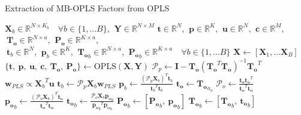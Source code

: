 \begin{algorithm}[H]
\caption{Extraction of MB-OPLS Factors from OPLS}
\label{algorithm.3.7}
\begin{algorithmic}[1]
\REQUIRE $\mathbf{X}_b \in \mathbb{R}^{N \times K_b}
          \quad \forall b \in \{1, \dots B\}$,%
       $\:\mathbf{Y} \in \mathbb{R}^{N \times M}$
\ENSURE $\mathbf{t} \in \mathbb{R}^N$,%
      $\:\mathbf{p} \in \mathbb{R}^K$,%
      $\:\mathbf{u} \in \mathbb{R}^N$,%
      $\:\mathbf{c} \in \mathbb{R}^M$,%
      $\:\mathbf{T_o} \in \mathbb{R}^{N \times a}$,%
      $\:\mathbf{P_o} \in \mathbb{R}^{K \times a}$, \\
      $\:\mathbf{t}_b \in \mathbb{R}^N$,%
      $\:\mathbf{p}_b \in \mathbb{R}^K$,%
      $\:\mathbf{T_o}_b \in \mathbb{R}^{N \times a}$,%
      $\:\mathbf{P_o}_b \in \mathbb{R}^{K \times a}
       \quad \forall b \in \{1, \dots B\}$
\STATE $\mathbf{X} \gets [\mathbf{X}_1, \dots \mathbf{X}_B]$
\STATE $\{\mathbf{t}, \: \mathbf{p}, \: \mathbf{u}, \: \mathbf{c}, \:
        \mathbf{T_o}, \: \mathbf{P_o}\} \gets
        \mathrm{OPLS}(\mathbf{X}, \mathbf{Y})$
\STATE $\mathcal{P}_p \gets
        \mathbf{I} - \mathbf{T_o} \left(
         \mathbf{T_o}^T \mathbf{T_o}
        \right)^{-1} \mathbf{T_o}^T$
  \STATE $\mathbf{w}_{PLS} \propto {\mathbf{X}_b}^T \mathbf{u}$
  \STATE $\mathbf{t}_b \gets
          \mathcal{P}_p \mathbf{X}_b \mathbf{w}_{PLS}$
  \STATE $\mathbf{p}_b \gets
          \tfrac{(\mathcal{P}_p \mathbf{X}_b)^T \mathbf{t}_b}
                {{\mathbf{t}_b}^T \mathbf{t}_b}$
    \STATE $\mathbf{t_o} \gets \mathbf{T_o}_{a_o}$ 
    \STATE $\mathcal{P}_o \gets \tfrac{\mathbf{t_o} \mathbf{t_o}^T}
                                      {\mathbf{t_o}^T \mathbf{t_o}}$
    \STATE $\mathbf{p_o}_b \gets
            \tfrac{(\mathcal{P}_o \mathbf{X}_b)^T \mathbf{t_o}}
                  {\mathbf{t_o}^T \mathbf{t_o}}$
    \STATE $\mathbf{t_o}_b \gets
            \tfrac{\mathcal{P}_o \mathbf{X}_b \mathbf{p_o}_b}
                  {{\mathbf{p_o}_b}^T \mathbf{p_o}_b}$
    \STATE $\mathbf{P_o}_b \gets [\mathbf{P_o}_b, \: \mathbf{p_o}_b]$
    \STATE $\mathbf{T_o}_b \gets [\mathbf{T_o}_b, \: \mathbf{t_o}_b]$
  \ENDFOR
\ENDFOR
\end{algorithmic}
\end{algorithm}

